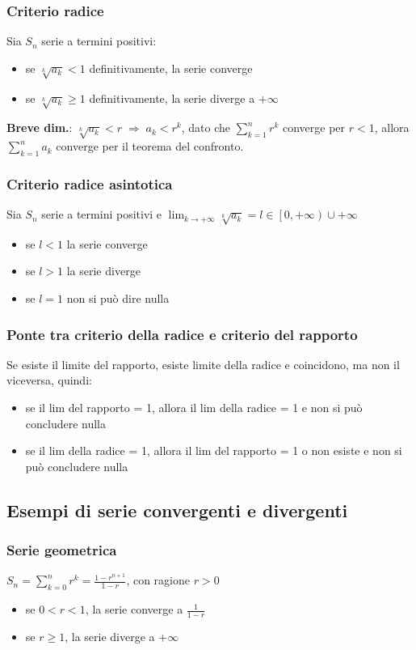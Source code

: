 \documentclass[a4paper]{article}
\begin{document}
\subsubsection*{Criterio radice}
Sia \(S_n\) serie a termini positivi:
\begin{itemize}
	\item se \(\sqrt[k]{a_k} < 1\) definitivamente, la serie converge
	\item se \(\sqrt[k]{a_k} \geq 1\) definitivamente, la serie diverge a \(+ \infty\)
\end{itemize}
\textbf{Breve dim.}: \(\sqrt[k]{a_k} < r \; \Rightarrow \; a_k < r^k\), dato che \(\sum_{k=1}^{n} r^k\) converge per \(r < 1\), allora \(\sum_{k=1}^{n} a_k\) converge per il teorema del confronto.

\subsubsection*{Criterio radice asintotica}
Sia \(S_n\) serie a termini positivi e \(\displaystyle \lim_{k \to +\infty} \sqrt[k]{a_k} = l \in \left[0, +\infty \right) \cup +\infty \)
\begin{itemize}
	\item se \(l < 1\) la serie converge
	\item se \(l > 1\) la serie diverge
	\item se \(l = 1\) non si può dire nulla
\end{itemize}

\subsubsection*{Ponte tra criterio della radice e criterio del rapporto}
Se esiste il limite del rapporto, esiste limite della radice e coincidono, ma non il viceversa, quindi:
\begin{itemize}
	\item se il lim del rapporto = 1, allora il lim della radice = 1 e non si può concludere nulla
	\item se il lim della radice = 1, allora il lim del rapporto = 1 o non esiste e non si può concludere nulla
\end{itemize}

\newpage

\subsection{Esempi di serie convergenti e divergenti}
\subsubsection*{Serie geometrica}
\(\displaystyle S_n = \sum_{k = 0}^{n} r ^ k = \frac{1-r^{n+1}}{1-r}\), con ragione \(r > 0\)
\begin{itemize}
	\item se \(0 < r < 1\), la serie converge a \(\frac{1}{1-r}\)
	\item se \(r \geq 1\), la serie diverge a \(+ \infty\)
\end{itemize}
\end{document}
